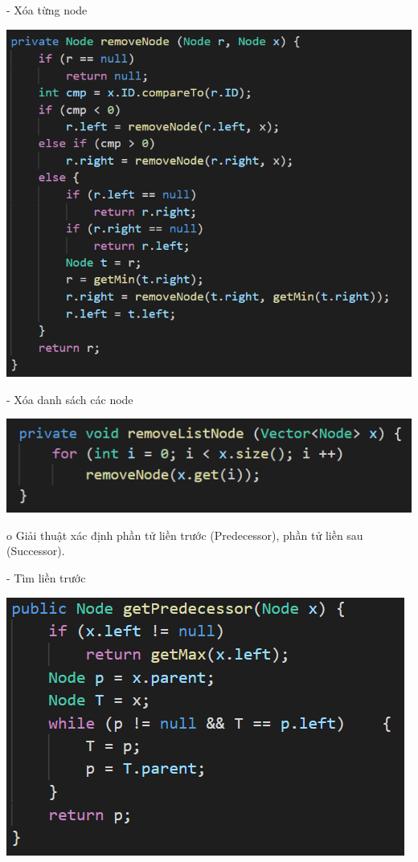 \documentclass{report}
\begin{document}
- Xóa từng node
\begin{center}
     \includegraphics[scale=1]{j}
    \end{center}
- Xóa danh sách các node
\begin{center}
     \includegraphics[scale=1]{k}
    \end{center}

o Giải thuật xác định phần tử liền trước (Predecessor), phần tử liền sau (Successor).

- Tìm liền trước
\begin{center}
     \includegraphics[scale=1]{l}
    \end{center}
\end{document}

